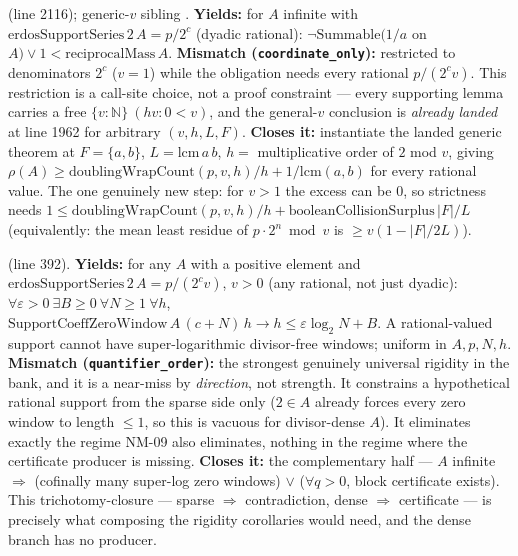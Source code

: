 \begin{obs} 
(line 2116); generic-$v$ sibling
.
\textbf{Yields:} for $A$ infinite with $\mathrm{erdosSupportSeries}\,2\,A = p/2^c$ (dyadic
rational): $\neg\mathrm{Summable}(1/a$ on $A) \vee 1 < \mathrm{reciprocalMass}\,A$.
\textbf{Mismatch (\texttt{coordinate\_only}):} restricted to denominators $2^c$ ($v{=}1$) while
the obligation needs every rational $p/(2^c v)$. This restriction is a call-site choice, not a
proof constraint — every supporting lemma carries a free $\{v:\mathbb N\}\ (hv:0<v)$, and the
general-$v$ conclusion is \emph{already landed} at line 1962 for arbitrary $(v,h,L,F)$.
\textbf{Closes it:} instantiate the landed generic theorem at $F=\{a,b\}$, $L=\mathrm{lcm}\,a\,b$,
$h=$ multiplicative order of $2$ mod $v$, giving $\rho(A) \ge
\mathrm{doublingWrapCount}(p,v,h)/h + 1/\mathrm{lcm}(a,b)$ for every rational value. The one
genuinely new step: for $v{>}1$ the excess can be $0$, so strictness needs $1 \le
\mathrm{doublingWrapCount}(p,v,h)/h + \mathrm{booleanCollisionSurplus}\,|F|/L$ (equivalently: the
mean least residue of $p\cdot2^n \bmod v$ is $\ge v(1-|F|/2L)$).
\end{obs}

\begin{obs} 
 (line 392).
\textbf{Yields:} for any $A$ with a positive element and
$\mathrm{erdosSupportSeries}\,2\,A=p/(2^c v)$, $v{>}0$ (any rational, not just dyadic):
$\forall\varepsilon{>}0\ \exists B\ge0\ \forall N\ge1\ \forall h$,
$\mathrm{SupportCoeffZeroWindow}\,A\,(c{+}N)\,h \to h \le \varepsilon\log_2 N + B$. A
rational-valued support cannot have super-logarithmic divisor-free windows; uniform in $A,p,N,h$.
\textbf{Mismatch (\texttt{quantifier\_order}):} the strongest genuinely universal rigidity in the
bank, and it is a near-miss by \emph{direction}, not strength. It constrains a hypothetical
rational support from the sparse side only ($2\in A$ already forces every zero window to length
$\le1$, so this is vacuous for divisor-dense $A$). It eliminates exactly the regime NM-09 also
eliminates, nothing in the regime where the certificate producer is missing.
\textbf{Closes it:} the complementary half — $A$ infinite $\Rightarrow$ (cofinally many
super-log zero windows) $\vee$ ($\forall q{>}0$, block certificate exists). This
trichotomy-closure — sparse $\Rightarrow$ contradiction, dense $\Rightarrow$ certificate — is
precisely what composing the rigidity corollaries would need, and the dense branch has no
producer.
\end{obs}

